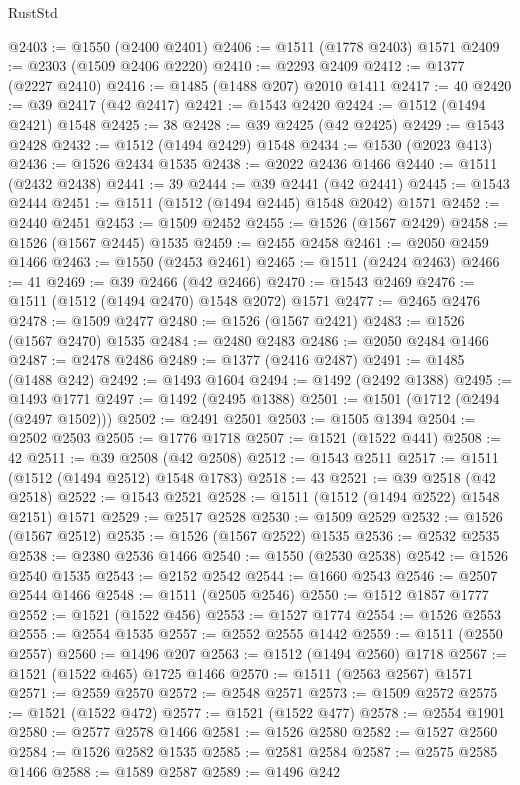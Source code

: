 \begin{lexlean}{RustStd}
\begin{coremodule}
{{@2403 := @1550 (@2400 @2401)
@2406 := @1511 (@1778 @2403) @1571
@2409 := @2303 (@1509 @2406 @2220)
@2410 := @2293 @2409
@2412 := @1377 (@2227 @2410)
@2416 := @1485 (@1488 @207) @2010 @1411
@2417 := 40
@2420 := @39 @2417 (@42 @2417)
@2421 := @1543 @2420
@2424 := @1512 (@1494 @2421) @1548
@2425 := 38
@2428 := @39 @2425 (@42 @2425)
@2429 := @1543 @2428
@2432 := @1512 (@1494 @2429) @1548
@2434 := @1530 (@2023 @413)
@2436 := @1526 @2434 @1535
@2438 := @2022 @2436 @1466
@2440 := @1511 (@2432 @2438)
@2441 := 39
@2444 := @39 @2441 (@42 @2441)
@2445 := @1543 @2444
@2451 := @1511 (@1512 (@1494 @2445) @1548 @2042) @1571
@2452 := @2440 @2451
@2453 := @1509 @2452
@2455 := @1526 (@1567 @2429)
@2458 := @1526 (@1567 @2445) @1535
@2459 := @2455 @2458
@2461 := @2050 @2459 @1466
@2463 := @1550 (@2453 @2461)
@2465 := @1511 (@2424 @2463)
@2466 := 41
@2469 := @39 @2466 (@42 @2466)
@2470 := @1543 @2469
@2476 := @1511 (@1512 (@1494 @2470) @1548 @2072) @1571
@2477 := @2465 @2476
@2478 := @1509 @2477
@2480 := @1526 (@1567 @2421)
@2483 := @1526 (@1567 @2470) @1535
@2484 := @2480 @2483
@2486 := @2050 @2484 @1466
@2487 := @2478 @2486
@2489 := @1377 (@2416 @2487)
@2491 := @1485 (@1488 @242)
@2492 := @1493 @1604
@2494 := @1492 (@2492 @1388)
@2495 := @1493 @1771
@2497 := @1492 (@2495 @1388)
@2501 := @1501 (@1712 (@2494 (@2497 @1502)))
@2502 := @2491 @2501
@2503 := @1505 @1394
@2504 := @2502 @2503
@2505 := @1776 @1718
@2507 := @1521 (@1522 @441)
@2508 := 42
@2511 := @39 @2508 (@42 @2508)
@2512 := @1543 @2511
@2517 := @1511 (@1512 (@1494 @2512) @1548 @1783)
@2518 := 43
@2521 := @39 @2518 (@42 @2518)
@2522 := @1543 @2521
@2528 := @1511 (@1512 (@1494 @2522) @1548 @2151) @1571
@2529 := @2517 @2528
@2530 := @1509 @2529
@2532 := @1526 (@1567 @2512)
@2535 := @1526 (@1567 @2522) @1535
@2536 := @2532 @2535
@2538 := @2380 @2536 @1466
@2540 := @1550 (@2530 @2538)
@2542 := @1526 @2540 @1535
@2543 := @2152 @2542
@2544 := @1660 @2543
@2546 := @2507 @2544 @1466
@2548 := @1511 (@2505 @2546)
@2550 := @1512 @1857 @1777
@2552 := @1521 (@1522 @456)
@2553 := @1527 @1774
@2554 := @1526 @2553
@2555 := @2554 @1535
@2557 := @2552 @2555 @1442
@2559 := @1511 (@2550 @2557)
@2560 := @1496 @207
@2563 := @1512 (@1494 @2560) @1718
@2567 := @1521 (@1522 @465) @1725 @1466
@2570 := @1511 (@2563 @2567) @1571
@2571 := @2559 @2570
@2572 := @2548 @2571
@2573 := @1509 @2572
@2575 := @1521 (@1522 @472)
@2577 := @1521 (@1522 @477)
@2578 := @2554 @1901
@2580 := @2577 @2578 @1466
@2581 := @1526 @2580
@2582 := @1527 @2560
@2584 := @1526 @2582 @1535
@2585 := @2581 @2584
@2587 := @2575 @2585 @1466
@2588 := @1589 @2587
@2589 := @1496 @242
}}
\end{coremodule}
\end{lexlean}
